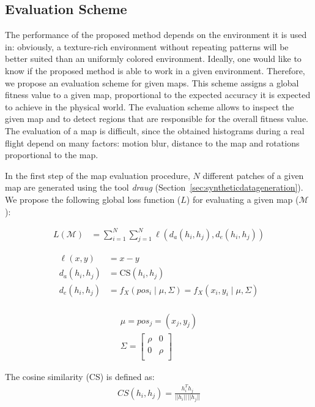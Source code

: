 \documentclass{report}
\begin{document}
\subsection{Evaluation Scheme}
\label{sec:evaluationscheme}

The performance of the proposed method depends on the environment it
is used in: obviously, a texture-rich environment without repeating
patterns will be better suited than an uniformly colored
environment. Ideally, one would like to know if the proposed method is
able to work in a given environment. Therefore, we propose an
evaluation scheme for given maps. This scheme assigns a global fitness
value to a given map, proportional to the expected accuracy it is
expected to achieve in the physical world. The evaluation scheme
allows to inspect the given map and to detect regions that are
responsible for the overall fitness value. The evaluation of a map is
difficult, since the obtained histograms during a real flight depend
on many factors: motion blur, distance to the map and rotations
proportional to the map.

In the first step of the map evaluation procedure, $N$ different
patches of a given map are generated using the tool \emph{draug}
(Section~\ref{sec:syntheticdatageneration}). We propose the following global loss function
($L$) for evaluating a given map ($\mathcal{M}$):

\begin{align}
  L(\mathcal{M}) &= \sum_{i = 1}^{N} \sum_{j = 1}^{N} \ell(d_a(h_i, h_j), d_e(h_i, h_j))
\end{align}

\begin{align}
  \ell(x, y) &= x - y\\
  d_a(h_i, h_j) &= \text{CS}(h_i, h_j)\\
  d_e(h_i, h_j) &= f_X(pos_i \mid \mu, \Sigma) = f_X(x_i, y_i \mid \mu, \Sigma)\\
\end{align}

\begin{align}
\mu = pos_j = (x_j, y_j)\\
\Sigma =
  \begin{bmatrix}
    \rho & 0\\
    0 & \rho\\
  \end{bmatrix}
\end{align}

The cosine similarity (CS) is defined as:
\begin{align}
CS(h_i, h_j) = \frac{h_i^Th_j}{||h_i||\,||h_j||}
\end{align}
\end{document}
